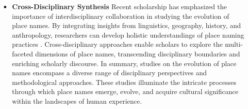 \begin{itemize}
	\item \textbf{Cross-Disciplinary Synthesis}
Recent scholarship has emphasized the importance of interdisciplinary collaboration in studying the evolution of place names. By integrating insights from linguistics, geography, history, and anthropology, researchers can develop holistic understandings of place naming practices \cite{Bolstad}. Cross-disciplinary approaches enable scholars to explore the multi-faceted dimensions of place names, transcending disciplinary boundaries and enriching scholarly discourse.
In summary, studies on the evolution of place names encompass a diverse range of disciplinary perspectives and methodological approaches. These studies illuminate the intricate processes through which place names emerge, evolve, and acquire cultural significance within the landscapes of human experience.
\end{itemize}

